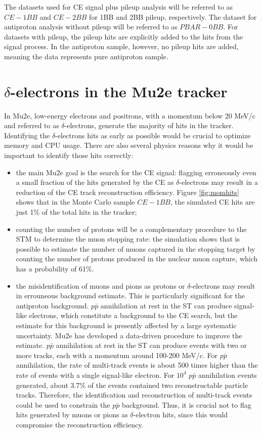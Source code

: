 The datasets used for CE signal plus pileup 
analysis will be referred to as $CE-1BB$ and $CE-2BB$ 
for 1BB and 2BB pileup, respectively. The dataset for 
antiproton analysis without pileup will be 
referred to as $PBAR-0BB$.
For datasets with pileup, 
the pileup hits are explicitly added to the hits from 
the signal process. In the antiproton sample, however, 
no pileup hits are added, meaning the data represents 
pure antiproton sample. 
\section{$\delta$-electrons in the Mu2e tracker}

In Mu2e, low-energy electrons 
and positrons, with a momentum below 20 MeV/c and 
referred to as $\delta$-electrons, 
generate the majority of hits in the tracker. 
Identifying the $\delta$-electrons hits as early 
as possible would be crucial to optimize memory 
and CPU usage. There are also several physics 
reasons why it would be important to identify 
those hits correctly:
\begin{itemize}
    \item the main Mu2e goal is the search for the 
    CE signal: flagging erroneously even a small 
    fraction of the hits generated by the 
    CE as $\delta$-electrons may result in a 
    reduction of the CE track reconstruction efficiency. 
    Figure \ref{fig:momhits} shows that in the 
    Monte Carlo sample $CE-1BB$, the simulated CE 
    hits are just 1\% of the total hits in the tracker;
    \item counting the number of protons 
    will be a complementary procedure to the 
    STM to determine the muon stopping rate: 
    the simulation shows that is possible to 
    estimate the number of muons captured in 
    the stopping target by counting the number 
    of protons produced in the nuclear muon 
    capture, which has a probability of 61\%.    
    \item the misidentification of muons 
    and pions as protons or $\delta$-electrons 
    may result in errouneous background estimate. 
    This is particularly significant for the 
    antiproton background.
    $p\bar{p}$ annihilation at rest in the ST 
    can produce signal-like electrons, which 
    constitute a background to the CE search, 
    but the estimate for this background is 
    presently affected by a large systematic 
    uncertainty. Mu2e has developed a data-driven 
    procedure to improve the estimate.
    $p\bar{p}$ annihilation at rest in the ST 
    can produce events with two or more tracks, 
    each with a momentum around 100-200 MeV/c. 
    For $p\bar{p}$ annihilation, 
    the rate of multi-track events 
    is about 500 times higher 
    than the rate of events with a single 
    signal-like electron. 
    For $10^4$ $p\bar{p}$ annihilation events 
    generated, about 3.7\% of 
    the events contained two reconstructable 
    particle tracks. Therefore, 
    the identification and reconstruction of 
    multi-track events could be 
    used to constrain the $p\bar{p}$ background. 
    Thus, it is crucial not to flag hits 
    generated by muons or pions as $\delta$-electron 
    hits, since this would compromise the 
    reconstruction efficiency. 
\end{itemize}
